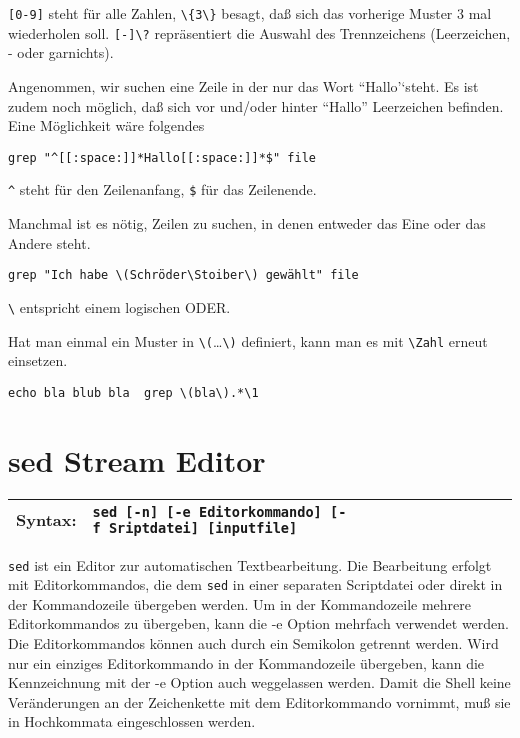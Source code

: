 \documentclass[12pt,]{article}
\begin{document}
\texttt{{[}0-9{]}} steht für alle Zahlen,
\texttt{\textbackslash{}\{3\textbackslash{}\}} besagt, daß sich das
vorherige Muster 3 mal wiederholen soll.
\texttt{{[}-{]}\textbackslash{}?} repräsentiert die Auswahl des
Trennzeichens (Leerzeichen, - oder garnichts).

Angenommen, wir suchen eine Zeile in der nur das Wort ``Hallo'`steht. Es
ist zudem noch möglich, daß sich vor und/oder hinter ``Hallo''
Leerzeichen befinden. Eine Möglichkeit wäre folgendes

\texttt{grep\ "\^{}{[}{[}:space:{]}{]}*Hallo{[}{[}:space:{]}{]}*\$"\ file}

\texttt{\^{}} steht für den Zeilenanfang, \texttt{\$} für das
Zeilenende.

Manchmal ist es nötig, Zeilen zu suchen, in denen entweder das Eine oder
das Andere steht.

\texttt{grep\ "Ich\ habe\ \textbackslash{}(Schröder\textbackslash{}\textbar{}Stoiber\textbackslash{})\ gewählt"\ file}

\texttt{\textbackslash{}\textbar{}} entspricht einem logischen ODER.

Hat man einmal ein Muster in
\texttt{\textbackslash{}(}\ldots{}\texttt{\textbackslash{})} definiert,
kann man es mit \texttt{\textbackslash{}Zahl} erneut einsetzen.

\texttt{echo\ bla\ blub\ bla\ \textbar{}\ grep\ \textquotesingle{}\textbackslash{}(bla\textbackslash{}).*\textbackslash{}1\textquotesingle{}}

\section{sed Stream Editor}\label{sed-stream-editor}

\begin{longtable}[c]{@{}ll@{}}
\toprule
Syntax: &
\texttt{sed\ {[}-n{]}\ {[}-e\ Editorkommando{]}\ {[}-f\ Sriptdatei{]}\ {[}inputfile{]}}\tabularnewline
\bottomrule
\end{longtable}

\texttt{sed} ist ein Editor zur automatischen Textbearbeitung. Die
Bearbeitung erfolgt mit Editorkommandos, die dem \texttt{sed} in einer
separaten Scriptdatei oder direkt in der Kommandozeile übergeben werden.
Um in der Kommandozeile mehrere Editorkommandos zu übergeben, kann die
-e Option mehrfach verwendet werden. Die Editorkommandos können auch
durch ein Semikolon getrennt werden. Wird nur ein einziges
Editorkommando in der Kommandozeile übergeben, kann die Kennzeichnung
mit der -e Option auch weggelassen werden. Damit die Shell keine
Veränderungen an der Zeichenkette mit dem Editorkommando vornimmt, muß
sie in Hochkommata eingeschlossen werden.
\end{document}
